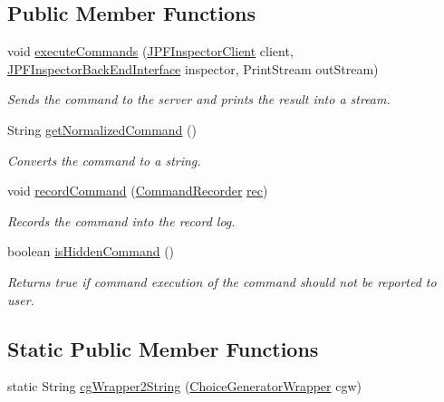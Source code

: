 \subsection*{Public Member Functions}
\begin{DoxyCompactItemize}
\item 
void \hyperlink{classgov_1_1nasa_1_1jpf_1_1inspector_1_1client_1_1commands_1_1_cmd_used_choice_generators_aba42fae6901a53b0c4131f88daf3fca6}{execute\+Commands} (\hyperlink{classgov_1_1nasa_1_1jpf_1_1inspector_1_1client_1_1_j_p_f_inspector_client}{J\+P\+F\+Inspector\+Client} client, \hyperlink{interfacegov_1_1nasa_1_1jpf_1_1inspector_1_1interfaces_1_1_j_p_f_inspector_back_end_interface}{J\+P\+F\+Inspector\+Back\+End\+Interface} inspector, Print\+Stream out\+Stream)
\begin{DoxyCompactList}\small\item\em Sends the command to the server and prints the result into a stream. \end{DoxyCompactList}\item 
String \hyperlink{classgov_1_1nasa_1_1jpf_1_1inspector_1_1client_1_1commands_1_1_cmd_used_choice_generators_a0454e0b394962f735a9dd86dcc222d3c}{get\+Normalized\+Command} ()
\begin{DoxyCompactList}\small\item\em Converts the command to a string. \end{DoxyCompactList}\item 
void \hyperlink{classgov_1_1nasa_1_1jpf_1_1inspector_1_1client_1_1_client_command_ae0670332ec750bc5b9016d0b04d8adfe}{record\+Command} (\hyperlink{classgov_1_1nasa_1_1jpf_1_1inspector_1_1client_1_1_command_recorder}{Command\+Recorder} \hyperlink{classgov_1_1nasa_1_1jpf_1_1inspector_1_1client_1_1_client_command_af4246f2427035c72a6af45a2c61361f7}{rec})
\begin{DoxyCompactList}\small\item\em Records the command into the record log. \end{DoxyCompactList}\item 
boolean \hyperlink{classgov_1_1nasa_1_1jpf_1_1inspector_1_1client_1_1_client_command_afb09c400c64e2d8e01059b91ff847761}{is\+Hidden\+Command} ()
\begin{DoxyCompactList}\small\item\em Returns true if command execution of the command should not be reported to user. \end{DoxyCompactList}\end{DoxyCompactItemize}
\subsection*{Static Public Member Functions}
\begin{DoxyCompactItemize}
\item 
static String \hyperlink{classgov_1_1nasa_1_1jpf_1_1inspector_1_1client_1_1commands_1_1_cmd_used_choice_generators_a3030a6cff0aa82bac741481d2455477c}{cg\+Wrapper2\+String} (\hyperlink{classgov_1_1nasa_1_1jpf_1_1inspector_1_1utils_1_1_choice_generator_wrapper}{Choice\+Generator\+Wrapper} cgw)
\end{DoxyCompactItemize}
